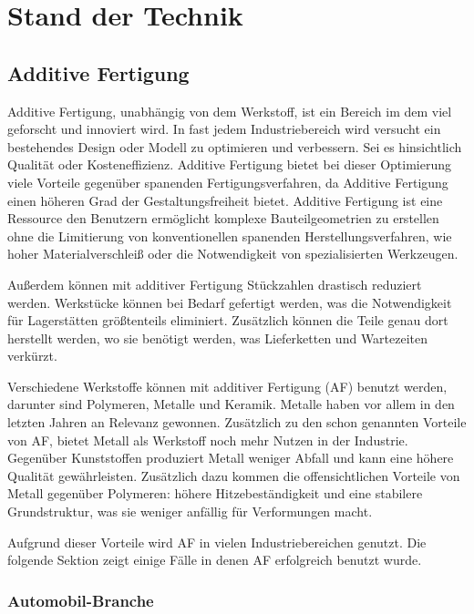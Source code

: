 \documentclass[../main.tex]{subfiles}
\begin{document}
\section{Stand der Technik}

\subsection{Additive Fertigung}

Additive Fertigung, unabhängig von dem Werkstoff, ist ein Bereich im dem viel
geforscht und innoviert wird. In fast jedem Industriebereich wird versucht ein
bestehendes Design oder Modell zu optimieren und verbessern. \cite{newMethod}
Sei es hinsichtlich Qualität oder Kosteneffizienz. Additive Fertigung bietet bei 
dieser Optimierung viele Vorteile gegenüber spanenden Fertigungsverfahren, da 
Additive Fertigung einen höheren Grad der Gestaltungsfreiheit bietet. 
Additive Fertigung ist eine Ressource den Benutzern ermöglicht komplexe 
Bauteilgeometrien zu erstellen ohne die Limitierung von konventionellen spanenden 
Herstellungsverfahren, wie hoher Materialverschleiß oder die Notwendigkeit von 
spezialisierten Werkzeugen. \cite{Vafadar.2021} 

Außerdem können mit additiver Fertigung Stückzahlen drastisch reduziert werden.
Werkstücke können bei Bedarf gefertigt werden, was die Notwendigkeit für Lagerstätten
größtenteils eliminiert. Zusätzlich können die Teile genau dort herstellt werden, wo 
sie benötigt werden, was Lieferketten und Wartezeiten verkürzt.

Verschiedene Werkstoffe können mit additiver Fertigung (AF) benutzt werden, darunter
sind Polymeren, Metalle und Keramik. Metalle haben vor allem in den letzten Jahren 
an Relevanz gewonnen. Zusätzlich zu den schon genannten Vorteile von AF, 
bietet Metall als Werkstoff noch mehr Nutzen in der Industrie. Gegenüber Kunststoffen
produziert Metall weniger Abfall und kann eine höhere Qualität gewährleisten.
Zusätzlich dazu kommen die offensichtlichen Vorteile von Metall gegenüber Polymeren: 
höhere Hitzebeständigkeit und eine stabilere Grundstruktur, was sie weniger anfällig 
für Verformungen macht.

Aufgrund dieser Vorteile wird AF in vielen Industriebereichen genutzt. Die folgende
Sektion zeigt einige Fälle in denen AF erfolgreich benutzt wurde.

\subsubsection*{Automobil-Branche}
\end{document}
